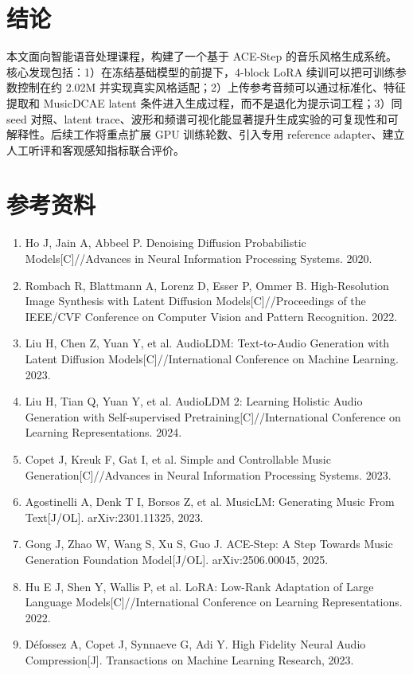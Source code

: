 \documentclass[UTF8,a4paper,zihao=-4,fontset=none]{ctexart}
\begin{document}
\section{结论}
本文面向智能语音处理课程，构建了一个基于 ACE-Step 的音乐风格生成系统。核心发现包括：1）在冻结基础模型的前提下，4-block LoRA 续训可以把可训练参数控制在约 2.02M 并实现真实风格适配；2）上传参考音频可以通过标准化、特征提取和 MusicDCAE latent 条件进入生成过程，而不是退化为提示词工程；3）同 seed 对照、latent trace、波形和频谱可视化能显著提升生成实验的可复现性和可解释性。后续工作将重点扩展 GPU 训练轮数、引入专用 reference adapter、建立人工听评和客观感知指标联合评价。

\section*{参考资料}
\begin{enumerate}[leftmargin=2em]
\item Ho J, Jain A, Abbeel P. Denoising Diffusion Probabilistic Models[C]//Advances in Neural Information Processing Systems. 2020.
\item Rombach R, Blattmann A, Lorenz D, Esser P, Ommer B. High-Resolution Image Synthesis with Latent Diffusion Models[C]//Proceedings of the IEEE/CVF Conference on Computer Vision and Pattern Recognition. 2022.
\item Liu H, Chen Z, Yuan Y, et al. AudioLDM: Text-to-Audio Generation with Latent Diffusion Models[C]//International Conference on Machine Learning. 2023.
\item Liu H, Tian Q, Yuan Y, et al. AudioLDM 2: Learning Holistic Audio Generation with Self-supervised Pretraining[C]//International Conference on Learning Representations. 2024.
\item Copet J, Kreuk F, Gat I, et al. Simple and Controllable Music Generation[C]//Advances in Neural Information Processing Systems. 2023.
\item Agostinelli A, Denk T I, Borsos Z, et al. MusicLM: Generating Music From Text[J/OL]. arXiv:2301.11325, 2023.
\item Gong J, Zhao W, Wang S, Xu S, Guo J. ACE-Step: A Step Towards Music Generation Foundation Model[J/OL]. arXiv:2506.00045, 2025.
\item Hu E J, Shen Y, Wallis P, et al. LoRA: Low-Rank Adaptation of Large Language Models[C]//International Conference on Learning Representations. 2022.
\item Défossez A, Copet J, Synnaeve G, Adi Y. High Fidelity Neural Audio Compression[J]. Transactions on Machine Learning Research, 2023.

\end{enumerate}
\end{document}
